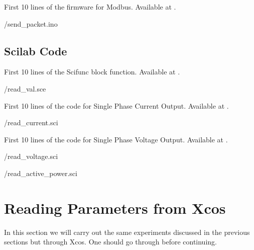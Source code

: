 \begin{ardcode}
  {First 10 lines of the firmware for Modbus.  Available at
    .}
  \label{ard:firmware-modbus}
  
  {\LocMODardcode/send_packet.ino}
\end{ardcode}

\subsection{Scilab Code}
\label{sec:modbus-scilab-code}

\begin{scicode}
  {First 10 lines of the Scifunc block function.  Available at
    .}
  \label{sci:current-modbus}
  
  {\LocMODscicode/read_val.sce}
\end{scicode}

\begin{scicode}
  {First 10 lines of the code for Single Phase Current Output.
    Available at .}
  \label{sci:current-modbus}
  
  {\LocMODscicode/read_current.sci}
\end{scicode}

\begin{scicode}
  {First 10 lines of the code for Single Phase Voltage Output.
    Available at .}
  \label{sci:voltage-modbus}
  
  {\LocMODscicode/read_voltage.sci}
\end{scicode}

\begin{scicode}
  \label{sci:modbus-power}
  
  {\LocMODscicode/read_active_power.sci}
\end{scicode}

\section{Reading Parameters from Xcos}
In this section we will carry out the same experiments discussed in
the previous sections but through Xcos. One should go through
 before continuing.

